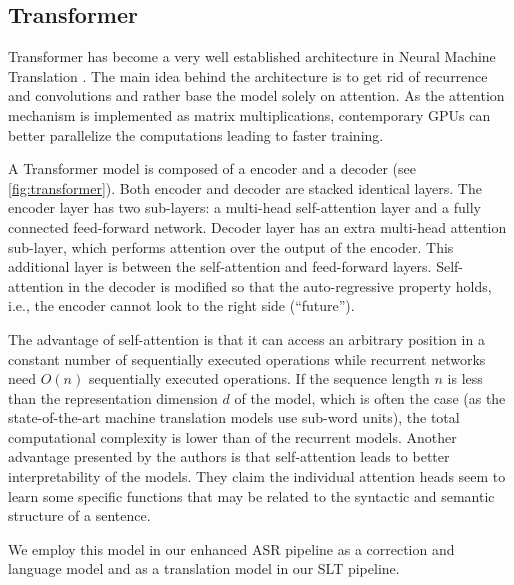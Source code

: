 \subsection{Transformer}
Transformer  has become a very well established architecture in Neural Machine Translation . The main idea behind the architecture is to get rid of recurrence and convolutions and rather base the model solely on attention. As the attention mechanism is implemented as matrix multiplications, contemporary GPUs can better parallelize the computations leading to faster training.

A Transformer model is composed of a encoder and a decoder (see \cref{fig:transformer}). Both encoder and decoder are stacked identical layers. The encoder layer has two sub-layers: a multi-head self-attention layer and a fully connected feed-forward network. Decoder layer has an extra multi-head attention sub-layer, which performs attention over the output of the encoder. This additional layer is between the self-attention and feed-forward layers. Self-attention in the decoder is modified so that the auto-regressive property holds, i.e., the encoder cannot look to the right side (``future'').

The advantage of self-attention is that it can access an arbitrary position in a constant number of sequentially executed operations while recurrent networks need $O(n)$ sequentially executed operations. If the sequence length $n$ is less than the representation dimension $d$ of the model, which is often the case (as the state-of-the-art machine translation models use sub-word units), the total computational complexity is lower than of the recurrent models. Another advantage presented by the authors is that self-attention leads to better interpretability of the models. They claim the individual attention heads seem to learn some specific functions that may be related to the syntactic and semantic structure of a sentence.

We employ this model in our enhanced ASR pipeline as a correction and language model and as a translation model in our SLT pipeline. 


